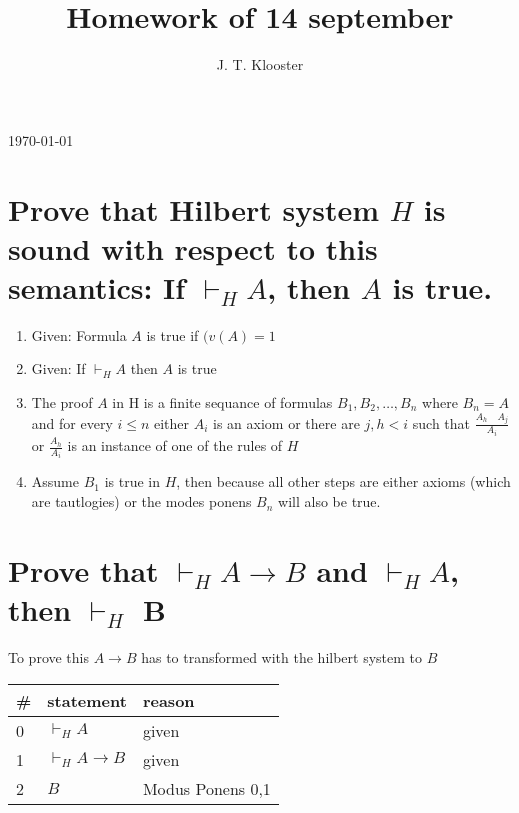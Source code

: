 \documentclass{article}
\begin{document}
\author{J. T. Klooster}
\title{Homework of 14 september}
\maketitle
\today
\section{Prove that Hilbert system $H$ is sound with respect to this
semantics: If $\vdash_H A$, then $A$ is true.}
\begin{enumerate}
	\item Given: Formula $A$ is true if $(v(A) = 1$
	\item Given: If $\vdash_H A$ then $A$ is true 
	\item The proof $A$ in H is a finite sequance of formulas $B_1, B_2,
		\dots, B_n$ where $B_n = A$ and for every $i \le n$ either $A_i$ is
		an axiom or there are $j,h < i$ such that $\frac{A_h \quad A_j}{A_i}
		$ or $\frac{A_h}{A_i}$ is an instance of one of the rules of $H$
	\item Assume $B_1$ is true in $H$, then because all other steps
		are either axioms (which are tautlogies) or the modes ponens
		$B_n$ will also be true.

\end{enumerate}


\section{Prove that $\vdash_H A \to B$ and $\vdash_H A$, then $\vdash_H$ B}
To prove this $A \to B$ has to transformed with the hilbert system to $B$

\begin{tabular}{@{}l|ll@{}}
\#& statement			&reason \\ \toprule
0& $\vdash_H A$ & given \\
1& $\vdash_H A \to B$ & given \\
2& $B$ & Modus Ponens 0,1 \\
\end{tabular}
\end{document}
